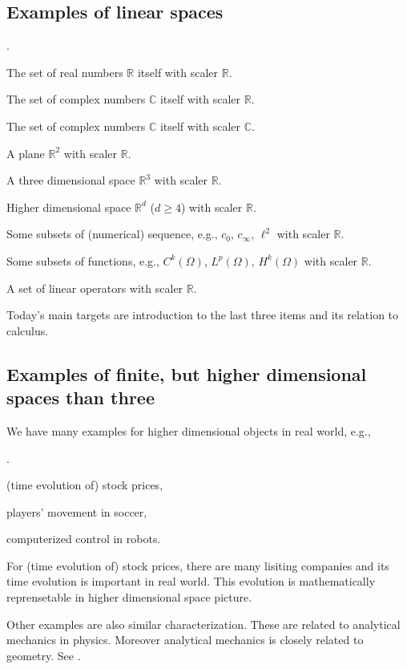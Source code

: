 \documentclass[openany, a4paper, oneside]{book}
\newcounter{enum2}
\renewenvironment{enumerate}{%
\begin{list}%
{%
\arabic{enum2}.\ \,%
}%
{%
\usecounter{enum2}
\setlength{\itemindent}{0pt}%
\setlength{\leftmargin}{6pt}%
\setlength{\rightmargin}{0pt}%
\setlength{\labelsep}{0pt}%
\setlength{\labelwidth}{6pt}%
\setlength{\itemsep}{0pt}%
\setlength{\parsep}{0pt}%
\setlength{\listparindent}{0pt}%
}
}{%
\end{list}%
}
\theoremstyle{break}
\theoremstyle{breakdefn}
\newcommand{\rbk}[1]{\left (#1\right)}
\newcommand{\bbC}{\mathbb{C}}
\newcommand{\bbR}{\mathbb{R}}
\begin{document}
\subsection{Examples of linear spaces}
\label{sec-4-1-2-2}

\begin{enumerate}
\item The set of real numbers $\bbR$ itself with scaler $\bbR$.
\item The set of complex numbers $\bbC$ itself with scaler $\bbR$.
\item The set of complex numbers $\bbC$ itself with scaler $\bbC$.
\item A plane $\bbR^2$ with scaler $\bbR$.
\item A three dimensional space $\bbR^3$ with scaler $\bbR$.
\item Higher dimensional space $\bbR^d$ ($d \geq 4$) with scaler $\bbR$.
\item Some subsets of (numerical) sequence, e.g., $c_0$, $c_{\infty}$, $\ell^2$ with scaler $\bbR$.
\item Some subsets of functions, e.g., $C^k(\Omega)$, $L^p \rbk{\Omega}$, $H^k \rbk{\Omega}$ with scaler $\bbR$.
\item A set of linear operators with scaler $\bbR$.
\end{enumerate}

Today's main targets are introduction to the last three items and its relation to calculus.
\subsection{Examples of finite, but higher dimensional spaces than three}
\label{sec-4-1-2-3}

We have many examples for higher dimensional objects in real world, e.g.,
\begin{enumerate}
\item (time evolution of) stock prices,
\item players' movement in soccer,
\item computerized control in robots.
\end{enumerate}
For (time evolution of) stock prices,
there are many lisiting companies and its time evolution is important in real world.
This evolution is mathematically reprensetable in higher dimensional space picture.

Other examples are also similar characterization.
These are related to analytical mechanics in physics.
Moreover analytical mechanics is closely related to geometry.
See \cite{KenjiFukaya1, NakamuraYamamoto1, NakamuraYamamoto2}.
\end{document}

